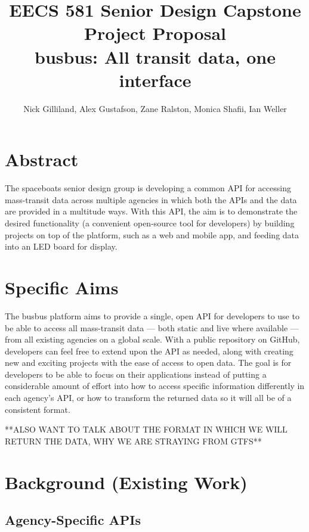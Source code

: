 \documentclass[12pt]{article}
\title{EECS 581 Senior Design Capstone Project Proposal \\
busbus: All transit data, one interface}
\author{Nick Gilliland, Alex Gustafson, Zane Ralston, Monica Shafii, Ian Weller}
\begin{document}
\maketitle

\section{Abstract}

The spaceboats senior design group is developing a common API for accessing mass-transit data
across multiple agencies in which both the APIs and the data are provided in a multitude ways.
With this API, the aim is to demonstrate the desired functionality (a convenient open-source tool 
for developers) by building projects on top of the platform, such as a web and mobile app, and 
feeding data into an LED board for display.

\section{Specific Aims}

The busbus platform aims to provide a single, open API for developers to use to be able to access all
mass-transit data --- both static and live where available --- from all existing agencies on a global scale.
With a public repository on GitHub, developers can feel free to extend upon the API as needed,
along with creating new and exciting projects with the ease of access to open data. The goal is for
developers to be able to focus on their applications instead of putting a considerable amount of
effort into how to access specific information differently in each agency's API, or how to transform
the returned data so it will all be of a consistent format.

**ALSO WANT TO TALK ABOUT THE FORMAT IN WHICH WE WILL RETURN THE DATA, WHY WE
ARE STRAYING FROM GTFS**

\section{Background (Existing Work)}
\subsection{Agency-Specific APIs}
\end{document}
